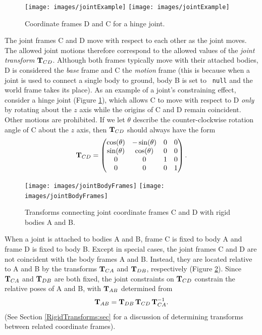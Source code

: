 \begin{figure}[ht]
\begin{center}
 \iflatexml
   \texttt{[image: images/jointExample]}
 \else
   \texttt{[image: images/jointExample]}
 \fi
\end{center}
\caption{Coordinate frames D and C for a hinge joint.}
\label{jointExample:fig}
\end{figure}

The joint frames C and D move with respect to each other as the joint
moves. The allowed joint motions therefore correspond to the allowed
values of the {\it joint transform} ${\bf T}_{CD}$.  Although both frames
typically move with their attached bodies, D is considered the {\it
base} frame and C the {\it motion} frame (this is because when a joint
is used to connect a single body to ground, body B is set to {\tt
null} and the world frame takes its place).  As an example of a
joint's constraining effect, consider a hinge joint (Figure
\ref{jointExample:fig}), which allows C to move with respect to D {\it only} by
rotating about the $z$ axis while the origins of C and D remain
coincident. Other motions are prohibited. If we let $\theta$ describe
the counter-clockwise rotation angle of C about the $z$ axis, then
${\bf T}_{CD}$ should always have the form
%
\begin{equation}
{\bf T}_{CD} = \left(\begin{matrix}
\cos(\theta) & -\sin(\theta) & 0 & 0 \\
\sin(\theta) &  \cos(\theta) & 0 & 0 \\
0 & 0 & 1 & 0 \\
0 & 0 & 0 & 1 
\end{matrix}\right).
\end{equation}
%

\begin{figure}[ht]
\begin{center}
 \iflatexml
   \texttt{[image: images/jointBodyFrames]}
 \else
   \texttt{[image: images/jointBodyFrames]}
 \fi
\end{center}
\caption{Transforms connecting joint coordinate frames C and D with
rigid bodies A and B.}
\label{jointBodyFrames:fig}
\end{figure}

When a joint is attached to bodies A and B, frame C is fixed to body A
and frame D is fixed to body B. Except in special cases, the joint
frames C and D are not coincident with the body frames A
and B.  Instead, they are located relative to A and B by the
transforms ${\bf T}_{CA}$ and ${\bf T}_{DB}$, respectively
(Figure \ref{jointBodyFrames:fig}). Since ${\bf T}_{CA}$ and ${\bf T}_{DB}$ are
both fixed, the joint constraints on ${\bf T}_{CD}$ constrain the relative
poses of A and B, with ${\bf T}_{AB}$ determined from
%
\begin{equation}
{\bf T}_{AB} = {\bf T}_{DB} \, {\bf T}_{CD} \, {\bf T}_{CA}^{-1}.
\label{jointPose:eqn}
\end{equation}
%
(See Section \ref{RigidTransforms:sec} for a discussion of determining
transforms between related coordinate frames).

